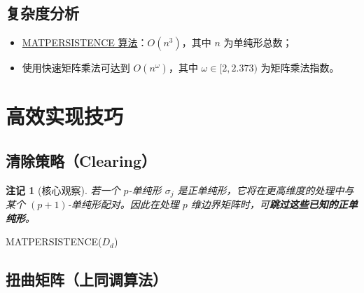 \documentclass[UTF8]{ctexart}
\newtheorem{remark}[definition]{注记}
\begin{document}
\subsection{复杂度分析}

\begin{itemize}
    \item \hyperref[alg:matpersistence]{MATPERSISTENCE 算法}：\(O(n^3)\)，其中 \(n\) 为单纯形总数；
    \item 使用快速矩阵乘法可达到 \(O(n^\omega)\)，其中 \(\omega \in [2, 2.373)\) 为矩阵乘法指数。
\end{itemize}

\section{高效实现技巧}
\label{sec:clearpersistence}

\subsection{清除策略（Clearing）}

\begin{remark}[核心观察]
若一个 \(p\)-单纯形 \(\sigma_j\) 是正单纯形，它将在更高维度的处理中与某个 \((p+1)\)-单纯形配对。因此在处理 \(p\) 维边界矩阵时，可\textbf{跳过这些已知的正单纯形}。
\end{remark}

\begin{algorithm}[htbp]
\caption{CLEARPERSISTENCE}
\label{alg:clearpersistence}
\;\textsc{MATPERSISTENCE}($D_d$)\;
\end{algorithm}

\subsection{扭曲矩阵（上同调算法）}
\end{document}
